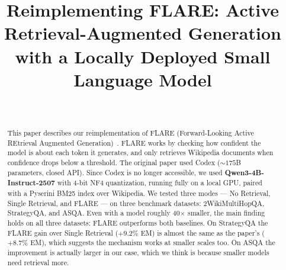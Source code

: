 \documentclass[conference]{IEEEtran}
\begin{document}
\title{%
    Reimplementing FLARE: Active\\
    Retrieval-Augmented Generation\\
    with a Locally Deployed Small Language Model%
}

\author{%

    \\


    \vspace{0.3cm}

}

\maketitle

\begin{abstract}
This paper describes our reimplementation of FLARE (Forward-Looking
Active REtrieval Augmented Generation)~\cite{sun2023flare}. FLARE
works by checking how confident the model is about each token it
generates, and only retrieves Wikipedia documents when confidence
drops below a threshold. The original paper used Codex
(${\sim}175$B parameters, closed API). Since Codex is no longer
accessible, we used \textbf{Qwen3-4B-Instruct-2507} with 4-bit NF4
quantization, running fully on a local GPU, paired with a Pyserini
BM25 index over Wikipedia. We tested three modes — No Retrieval,
Single Retrieval, and FLARE — on three benchmark datasets:
2WikiMultiHopQA, StrategyQA, and ASQA. Even with a model roughly
40$\times$ smaller, the main finding holds on all three datasets:
FLARE outperforms both baselines. On StrategyQA the FLARE gain
over Single Retrieval ($+9.2$\% EM) is almost the same as the
paper's ($+8.7$\% EM), which suggests the mechanism works at
smaller scales too. On ASQA the improvement is actually larger
in our case, which we think is because smaller models need
retrieval more.
\end{abstract}
\end{document}
